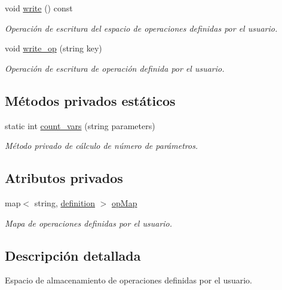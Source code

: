 \begin{DoxyCompactItemize}
void \hyperlink{class_operation_space_a20984ed564af09da9402980310f538c9}{write} () const 
\begin{DoxyCompactList}\small\item\em Operación de escritura del espacio de operaciones definidas por el usuario. \end{DoxyCompactList}\item 
void \hyperlink{class_operation_space_af671c739e788c44d4af703d4e0fd2284}{write\+\_\+op} (string key)
\begin{DoxyCompactList}\small\item\em Operación de escritura de operación definida por el usuario. \end{DoxyCompactList}\end{DoxyCompactItemize}
\subsection*{Métodos privados estáticos}
\begin{DoxyCompactItemize}
\item 
static int \hyperlink{class_operation_space_a44bd4c88e099da24bbc66c2bd1fa63aa}{count\+\_\+vars} (string parameters)
\begin{DoxyCompactList}\small\item\em Método privado de cálculo de número de parámetros. \end{DoxyCompactList}\end{DoxyCompactItemize}
\subsection*{Atributos privados}
\begin{DoxyCompactItemize}
\item 
map$<$ string, \hyperlink{struct_operation_space_1_1definition}{definition} $>$ \hyperlink{class_operation_space_aae64cd370655d6b2fb3f2305c5a520a7}{op\+Map}
\begin{DoxyCompactList}\small\item\em Mapa de operaciones definidas por el usuario. \end{DoxyCompactList}\end{DoxyCompactItemize}


\subsection{Descripción detallada}
Espacio de almacenamiento de operaciones definidas por el usuario. 

